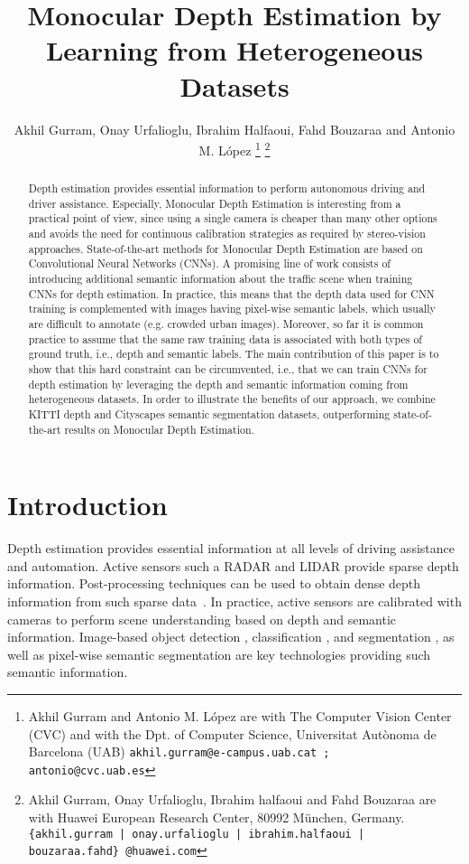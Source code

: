 \documentclass[letterpaper, 10 pt, conference]{ieeeconf}
\title{\LARGE \bf
Monocular Depth Estimation by Learning from Heterogeneous Datasets
}
\author{Akhil Gurram, Onay Urfalioglu, Ibrahim Halfaoui, Fahd Bouzaraa and Antonio M. L\'opez \thanks{Akhil Gurram and Antonio M. L\'opez are with The Computer Vision Center (CVC) and with the Dpt. of Computer Science, Universitat Aut\`onoma de Barcelona (UAB) {\tt\small akhil.gurram@e-campus.uab.cat ; antonio@cvc.uab.es} } \thanks{Akhil Gurram, Onay Urfalioglu, Ibrahim halfaoui and Fahd Bouzaraa are with Huawei European Research Center, 80992 M{\"u}nchen, Germany. {\tt\small \{akhil.gurram | onay.urfalioglu | ibrahim.halfaoui | bouzaraa.fahd\}~@huawei.com} } }
\begin{document}
\maketitle
\thispagestyle{empty}
\pagestyle{empty}


\begin{abstract}
Depth estimation provides essential information to perform autonomous driving and driver assistance. Especially, Monocular Depth Estimation is interesting from a practical point of view, since using a single camera is cheaper than many other options and avoids the need for continuous calibration strategies as required by stereo-vision approaches. State-of-the-art methods for Monocular Depth Estimation are based on Convolutional Neural Networks (CNNs). A promising line of work consists of introducing additional semantic information about the traffic scene when training CNNs for depth estimation. In practice, this means that the depth data used for CNN training is complemented with images having pixel-wise semantic labels, which usually are difficult to annotate (e.g. crowded urban images). Moreover, so far it is common practice to assume that the same raw training data is associated with both types of ground truth, i.e., depth and semantic labels. The main contribution of this paper is to show that this hard constraint can be circumvented, i.e., that we can train CNNs for depth estimation by leveraging the depth and semantic information coming from heterogeneous datasets. In order to illustrate the benefits of our approach, we combine KITTI depth and Cityscapes semantic segmentation datasets, outperforming state-of-the-art results on Monocular Depth Estimation.
\end{abstract}

\section{Introduction}

Depth estimation provides essential information at all levels of driving assistance and automation. Active sensors such a RADAR and LIDAR provide sparse depth information. Post-processing techniques can be used to obtain dense depth information from such sparse data~\cite{Premebida:2014}. In practice, active sensors are calibrated with cameras to perform scene understanding based on depth and semantic information. Image-based object detection \cite{Yang:2016}, classification \cite{Zhu:2016}, and segmentation \cite{He:2017}, as well as pixel-wise semantic segmentation \cite{Zhao:2017} are key technologies providing such semantic information. 
\end{document}

